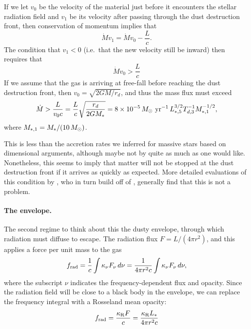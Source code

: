 If we let $v_0$ be the velocity of the material just before it encounters the stellar radiation field and $v_1$ be its velocity after passing through the dust destruction front, then conservation of momentum implies that
\begin{equation}
\dot{M} v_1 = \dot{M} v_0 - \frac{L}{c}.
\end{equation}
The condition that $v_1 < 0$ (i.e.\ that the new velocity still be inward) then requires that
\begin{equation}
\dot{M} v_0 > \frac{L}{c}
\end{equation}
If we assume that the gas is arriving at free-fall before reaching the dust destruction front, then $v_0 = \sqrt{2 G M/r_d}$, and thus the mass flux must exceed
\begin{equation}
\dot{M} > \frac{L}{v_0 c} = \frac{L}{c} \sqrt{\frac{r_d}{2 G M_*}} = 8\times 10^{-5} \,M_{\odot}\mbox{ yr}^{-1} \, L_{*,5}^{3/2} T_{d,3}^{-1} M_{*,1}^{-1/2},
\end{equation}
where $M_{*,1}=M_*/(10\,M_{\odot})$.

This is less than the accretion rates we inferred for massive stars based on dimensional arguments, although maybe not by quite as much as one would like. Nonetheless, this seems to imply that matter will not be stopped at the dust destruction front if it arrives as quickly as expected. More detailed evaluations of this condition by \citet{mckee03a}, who in turn build off of \citet{wolfire87a}, generally find that this is not a problem.

\paragraph{The envelope.}

The second regime to think about this the dusty envelope, through which radiation must diffuse to escape. The radiation flux $F=L/(4\pi r^2)$, and this applies a force per unit mass to the gas
\begin{equation}
f_{\rm rad} = \frac{1}{c} \int \kappa_{\nu} F_{\nu} \, d\nu = \frac{1}{4\pi r^2 c} \int \kappa_{\nu} F_{\nu} \, d\nu,
\end{equation}
where the subscript $\nu$ indicates the frequency-dependent flux and opacity. Since the radiation field will be close to a black body in the envelope, we can replace the frequency integral with a Rosseland mean opacity:
\begin{equation}
f_{\rm rad} = \frac{\kappa_{\rm R} F}{c} = \frac{\kappa_{\rm R} L_*}{4\pi r^2 c}
\end{equation}


